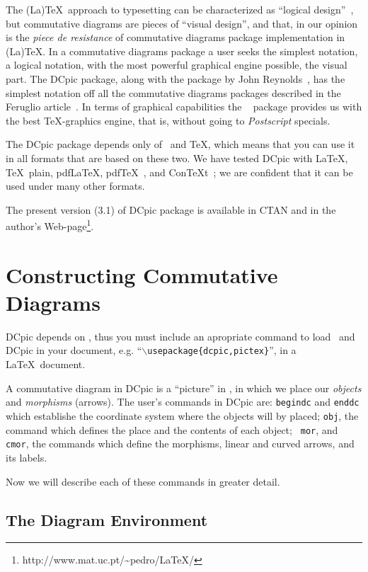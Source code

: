 \documentclass{europroc}
\begin{document}
The (La)\TeX\ approach to typesetting can be characterized as
``logical design''~\cite{Knuth86,Lamport94,Otten99}, but commutative
diagrams are pieces of ``visual design'', and that, in our opinion is
the {\em piece de resistance} of commutative diagrams package
implementation in (La)\TeX. In a commutative diagrams package a user
seeks the simplest notation, a logical notation, with the most
powerful graphical engine possible, the visual part. The DCpic
package, along with the package by John
Reynolds~\cite{Feruglio94,Reynolds87}, has the simplest notation off
all the commutative diagrams packages described in the Feruglio
article~\cite{Feruglio94}. In terms of graphical capabilities the
\PiCTeX~\cite{Wichura87} package provides us with the best
\TeX-graphics engine, that is, without going to {\em Postscript}
specials.

The DCpic package depends only of \PiCTeX\ and \TeX,
which means that you can use it in all formats that are based on these
two. We have tested DCpic with \LaTeX, \TeX\ plain, pdf\LaTeX,
pdf\TeX~\cite{Thanh99}, and Con\TeX t~\cite{Otten99}; we are confident
that it can be used under many other formats.

The present version (3.1) of DCpic package is available in CTAN and in
the author's Web-page\footnote{http://www.mat.uc.pt/{\~{}}pedro/LaTeX/}.


\section{Constructing Commutative Diagrams}

DCpic depends on \PiCTeX, thus you must include an apropriate command
to load \PiCTeX\ and DCpic in your document,
e.g. ``{\tt $\backslash$usepackage\{dcpic,pictex\}}'', in a \LaTeX\ document.

A commutative diagram in DCpic is a ``picture'' in \PiCTeX, in which
we place our {\em objects} and {\em morphisms} (arrows). The user's
commands in DCpic are: {\tt begindc} and {\tt enddc} which establishe
the coordinate system where the objects will by placed; {\tt obj}, the
command which defines the place and the contents of each object; {\tt
mor}, and {\tt cmor}, the commands which define the morphisms, linear
and curved arrows, and its labels.

Now we will describe each of these commands in greater detail.

\subsection{The Diagram Environment}
\end{document}
